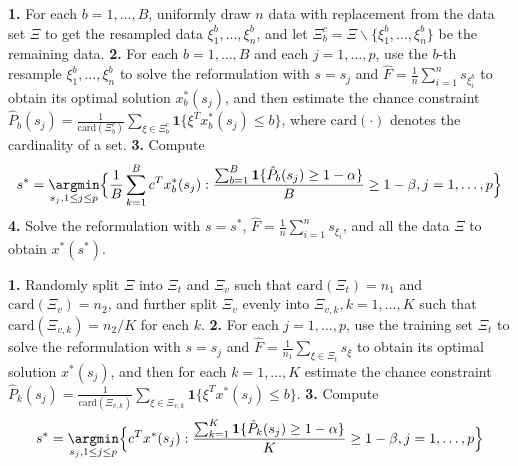 \documentclass[mnsc,blindrev]{informs4} %
\begin{document}
\begin{APPENDICES}
\begin{algorithm}[H]
\caption{Bootstrapping (Section 7.2.3 in \cite{esfahani2018data})}
\label{bootstrap}
\begin{algorithmic}
\vspace{1ex}
\STATE \textbf{1.} For each $b=1,\ldots,B$, uniformly draw $n$ data with replacement from the data set $\Xi$ to get the resampled data $\xi^b_1,\ldots,\xi^b_n$, and let $\Xi^c_b=\Xi\backslash\{\xi^b_1,\ldots,\xi^b_n\}$ be the remaining data.
\STATE \textbf{2.} For each $b=1,\ldots,B$ and each $j=1,\ldots,p$, use the $b$-th resample $\xi^b_1,\ldots,\xi^b_n$ to solve the reformulation with $s=s_j$ and $\hat F=\frac{1}{n}\sum_{i=1}^ns_{\xi^b_i}$ to obtain its optimal solution $x^*_b(s_j)$, and then estimate the chance constraint $\hat P_b(s_j)=\frac{1}{\mathrm{card}(\Xi^c_b)}\sum_{\xi\in \Xi^c_b}\mathbf{1}\{\xi^Tx^*_b(s_j)\leq b\}$, where $\mathrm{card}(\cdot)$ denotes the cardinality of a set.
\STATE \textbf{3.} Compute
\begin{equation*}
    s^* = \underset{s_j,1\leq j\leq p}\argmin\Big\{\frac{1}{B}\sum_{k=1}^Bc^Tx^*_b(s_j): \frac{\sum_{b=1}^B\mathbf{1}\{\hat P_b(s_j)\geq 1-\alpha\}}{B}\geq 1-\beta,j=1,\ldots,p\Big\}
\end{equation*}
\STATE \textbf{4.} Solve the reformulation with $s=s^*$, $\hat F=\frac{1}{n}\sum_{i=1}^ns_{\xi_i}$, and all the data $\Xi$ to obtain $x^*(s^*)$.

\vspace{1ex}
\end{algorithmic}
\end{algorithm}


\begin{algorithm}[H]
\caption{Sectioning (Section 5.2 in \cite{xie2018distributionally})}
\label{sectioning}
\begin{algorithmic}
\vspace{1ex}
\STATE \textbf{1.} Randomly split $\Xi$ into $\Xi_t$ and $\Xi_v$ such that $\mathrm{card}(\Xi_t)=n_1$ and $\mathrm{card}(\Xi_v)=n_2$, and further split $\Xi_v$ evenly into $\Xi_{v,k},k=1,\ldots,K$ such that $\mathrm{card}(\Xi_{v,k})=n_2/K$ for each $k$.
\STATE \textbf{2.} For each $j=1,\ldots,p$, use the training set $\Xi_t$ to solve the reformulation with $s=s_j$ and $\hat F=\frac{1}{n_1}\sum_{\xi\in\Xi_t}s_{\xi}$ to obtain its optimal solution $x^*(s_j)$, and then for each $k=1,\ldots,K$ estimate the chance constraint $\hat P_k(s_j)=\frac{1}{\mathrm{card}(\Xi_{v,k})}\sum_{\xi\in \Xi_{v,k}}\mathbf{1}\{\xi^Tx^*(s_j)\leq b\}$.
\STATE \textbf{3.} Compute
\begin{equation*}
    s^* = \underset{s_j,1\leq j\leq p}\argmin\Big\{c^Tx^*(s_j): \frac{\sum_{k=1}^K\mathbf{1}\{\hat P_k(s_j)\geq 1-\alpha\}}{K}\geq 1-\beta,j=1,\ldots,p\Big\}
\end{equation*}


\end{algorithmic}
\end{algorithm}
\end{APPENDICES}
\end{document}
